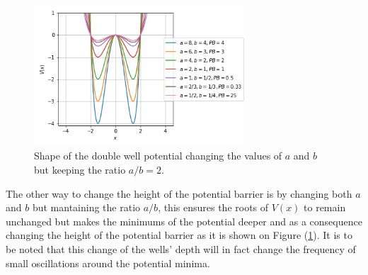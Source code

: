 \begin{figure}[H]
\centering
\includegraphics[width=0.7\textwidth]{Figures/double_well_PB.png}
\caption{Shape of the double well potential changing the values of $a$ and $b$ but keeping the ratio $a/b=2$.
}
\label{fig:PB_ratio}
\end{figure} 

The other way to change the height of the potential barrier is by changing both $a$ and $b$ but mantaining the ratio $a/b$, this ensures the roots of $V(x)$ to remain unchanged but makes the minimums of the potential deeper and as a consequence changing the height of the potential barrier as it is shown on Figure (\ref{fig:PB_ratio}). It is to be noted that this change of the wells' depth will in fact change the frequency of small oscillations  around the potential minima.

